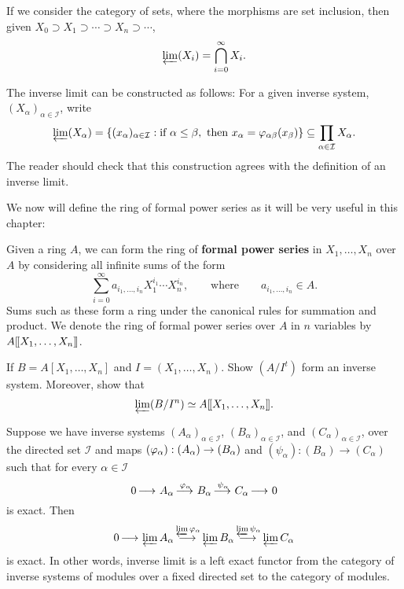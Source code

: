 \documentclass{ximera}
\begin{document}
\begin{example} If we consider the category of sets, where the morphisms are set inclusion, then given $X_0\supset X_1\supset \cdots \supset X_n\supset \cdots$,
\[
\varprojlim(X_i) = \bigcap_{i=0}^\infty X_i.
\]
\end{example}

\begin{example} The inverse limit can be constructed as follows: For a given inverse system, $(X_\alpha)_{\alpha\in \mathcal{I}}$, write
\[
\varprojlim(X_\alpha) = \{(x_\alpha)_{\alpha\in \mathcal{I}}:\text{if }\alpha\le \beta,\text{ then }x_\alpha = \varphi_{\alpha\beta}(x_\beta) \}\subseteq \prod_{\alpha\in \mathcal{I}} X_\alpha.
\]
The reader should check that this construction agrees with the definition of an inverse limit.
\end{example}

We now will define the ring of formal power series as it will be very useful in this chapter: 

\begin{definition} Given a ring $A$, we can form the ring of \textbf{formal power series} in $X_1,\dots,X_n$ over $A$ by considering all infinite sums of the form
\[
\sum_{i=0}^\infty a_{i_1,\dots, i_n}X_1^{i_1}\cdots X_n^{i_n},\qquad\text{where} \qquad a_{i_1,\dots, i_n}\in A.
\]
Sums such as these form a ring under the canonical rules for summation and product. We denote the ring of formal power series over $A$ in $n$ variables by $A[\hspace{-0.25ex}[ X_1,\dots,X_n]\hspace{-0.25ex}]$.
\end{definition}

\begin{exercise}
  If $B = A[X_1,\dots,X_n]$ and $I = (X_1,\dots,X_n)$. Show $(A/I^t)$
  form an inverse system. Moreover, show that
  \[
  \varprojlim(B/I^n) \simeq A[\hspace{-0.25ex}[ X_1,\dots,X_n]\hspace{-0.25ex}].
  \]
\end{exercise}





\begin{exercise} \label{invlimleftexact}
Suppose we have inverse systems $(A_\alpha)_{\alpha \in \mathcal{I}}$, $(B_\alpha)_{\alpha \in \mathcal{I}}$, and $(C_\alpha)_{\alpha \in \mathcal{I}}$, over the directed set $\mathcal{I}$ and maps $(\varphi_\alpha):(A_\alpha) \to (B_\alpha)$ and $(\psi_\alpha):(B_\alpha) \to (C_\alpha)$ such that for every $\alpha \in \mathcal{I}$
\[
0 \mathop{\longrightarrow\,}\limits A_\alpha \mathop{\longrightarrow\,}\limits^{\varphi_\alpha} B_\alpha \mathop{\longrightarrow\,}\limits^{\psi_\alpha} C_\alpha\mathop{\longrightarrow\,}\limits 0
\]
is exact.  Then
\[
0 \mathop{\longrightarrow\,}\limits \varprojlim A_\alpha \mathop{\longrightarrow\,}\limits^{\varprojlim \varphi_\alpha} \varprojlim B_\alpha \mathop{\longrightarrow\,}\limits^{\varprojlim \psi_\alpha} \varprojlim C_\alpha
\]
is exact.  In other words, inverse limit is a left exact functor from the category of inverse systems of modules over a fixed directed set to the category of modules.
\end{exercise}
\end{document}
